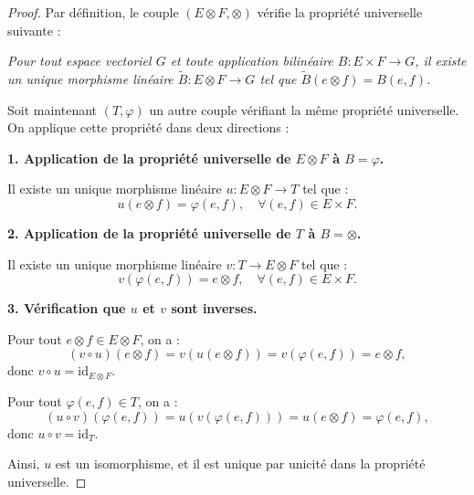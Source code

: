 \documentclass[12pt]{article}
\begin{document}
	\begin{proof}
		Par définition, le couple \( (E \otimes F, \otimes) \) vérifie la propriété universelle suivante :
		
		\emph{Pour tout espace vectoriel \( G \) et toute application bilinéaire \( B : E \times F \to G \), il existe un unique morphisme linéaire \( \tilde{B} : E \otimes F \to G \) tel que \( \tilde{B}(e \otimes f) = B(e, f) \).}
		
		Soit maintenant \( (T, \varphi) \) un autre couple vérifiant la même propriété universelle.  
		On applique cette propriété dans deux directions :
		
		\textbf{1. Application de la propriété universelle de \( E \otimes F \) à \( B = \varphi \).}
		
		Il existe un unique morphisme linéaire \( u : E \otimes F \to T \) tel que :
		\[
		u(e \otimes f) = \varphi(e, f), \quad \forall (e,f) \in E \times F.
		\]
		
		\textbf{2. Application de la propriété universelle de \( T \) à \( B = \otimes \).}
		
		Il existe un unique morphisme linéaire \( v : T \to E \otimes F \) tel que :
		\[
		v(\varphi(e, f)) = e \otimes f, \quad \forall (e,f) \in E \times F.
		\]
		
		\textbf{3. Vérification que \( u \) et \( v \) sont inverses.}
		
		Pour tout \( e \otimes f \in E \otimes F \), on a :
		\[
		(v \circ u)(e \otimes f) = v(u(e \otimes f)) = v(\varphi(e, f)) = e \otimes f,
		\]
		donc \( v \circ u = \mathrm{id}_{E \otimes F} \).
		
		Pour tout \( \varphi(e, f) \in T \), on a :
		\[
		(u \circ v)(\varphi(e, f)) = u(v(\varphi(e, f))) = u(e \otimes f) = \varphi(e, f),
		\]
		donc \( u \circ v = \mathrm{id}_T \).
		
		Ainsi, \( u \) est un isomorphisme, et il est unique par unicité dans la propriété universelle.
		
	\end{proof}
	
	
\end{document}
